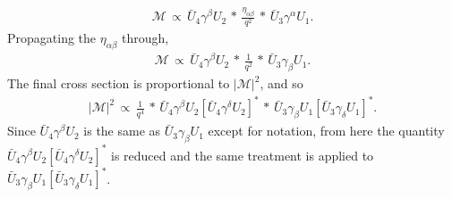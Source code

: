 \begin{align*}
\mathcal{M} \, \propto \, \bar{U}_4\gamma^\beta U_2 \, * \, \frac{\eta_{\alpha\beta}}{q^2}\, *\, \bar{U}_3\gamma^\alpha U_1.
\end{align*}
Propagating the $\eta_{\alpha\beta}$ through,
\begin{align*}
\mathcal{M} \, \propto \, \bar{U}_4\gamma^\beta U_2 \, * \, \frac{1}{q^2}\, *\, \bar{U}_3\gamma_\beta U_1.
\end{align*}
The final cross section is proportional to $|\mathcal{M}|^2$, and so
\begin{align*}
|\mathcal{M}|^2 \, \propto \, \frac{1}{q^4}\, *\, \bar{U}_4\gamma^\beta U_2 [\bar{U}_4\gamma^\delta U_2]^* \, * \,  \bar{U}_3\gamma_\beta U_1 [\bar{U}_3\gamma_\delta U_1]^*.
\end{align*}
Since $\bar{U}_4\gamma^\beta U_2$ is the same as $\bar{U}_3\gamma_\beta U_1$ except for notation, from here the quantity $\bar{U}_4\gamma^\beta U_2 [\bar{U}_4\gamma^\delta U_2]^* $ is reduced and the same treatment is applied to $\bar{U}_3\gamma_\beta U_1 [\bar{U}_3\gamma_\delta U_1]^*$.


